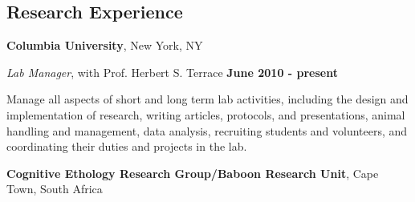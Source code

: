 \documentclass[margin,line]{res}
\newenvironment{list1}{
  \begin{list}{\ding{113}}{%
      \setlength{\itemsep}{0in}
      \setlength{\parsep}{0in} \setlength{\parskip}{0in}
      \setlength{\topsep}{0in} \setlength{\partopsep}{0in} 
      \setlength{\leftmargin}{0.17in}}}{\end{list}}
\begin{document}
\begin{resume}




\section{\sc Research Experience}

{\bf Columbia University}, New York, NY

\vspace{-.3cm}
{\em Lab Manager}, with Prof. Herbert S. Terrace \hfill {\bf June 2010 - present}\\
\vspace{-.5cm}

Manage all aspects of short and long term lab activities, including the design and implementation of research, writing articles, protocols, and presentations, animal handling and management, data analysis, recruiting students and volunteers, and coordinating their duties and projects in the lab.

\vspace{-.1cm}

{\bf Cognitive Ethology Research Group/Baboon Research Unit}, Cape Town, South Africa


\end{resume}
\end{document}
